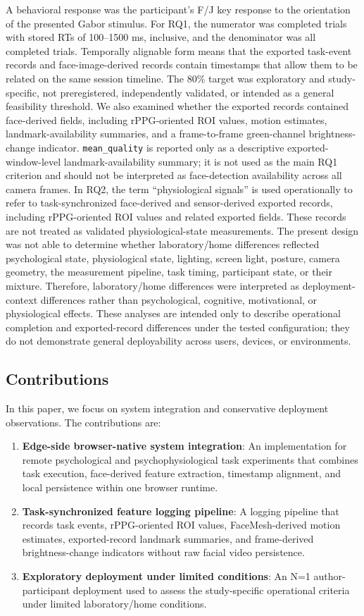 \documentclass[dvipdfmx]{ehis}
\begin{document}
A behavioral response was the participant's F/J key response to the orientation of the presented Gabor stimulus.
For RQ1, the numerator was completed trials with stored RTs of 100--1500 ms, inclusive, and the denominator was all completed trials.
Temporally alignable form means that the exported task-event records and face-image-derived records contain timestamps that allow them to be related on the same session timeline.
The 80\% target was exploratory and study-specific, not preregistered, independently validated, or intended as a general feasibility threshold.
We also examined whether the exported records contained face-derived fields, including rPPG-oriented ROI values, motion estimates, landmark-availability summaries, and a frame-to-frame green-channel brightness-change indicator.
\texttt{mean\_quality} is reported only as a descriptive exported-window-level landmark-availability summary; it is not used as the main RQ1 criterion and should not be interpreted as face-detection availability across all camera frames.
In RQ2, the term ``physiological signals'' is used operationally to refer to task-synchronized face-derived and sensor-derived exported records, including rPPG-oriented ROI values and related exported fields.
These records are not treated as validated physiological-state measurements.
The present design was not able to determine whether laboratory/home differences reflected psychological state, physiological state, lighting, screen light, posture, camera geometry, the measurement pipeline, task timing, participant state, or their mixture.
Therefore, laboratory/home differences were interpreted as deployment-context differences rather than psychological, cognitive, motivational, or physiological effects.
These analyses are intended only to describe operational completion and exported-record differences under the tested configuration; they do not demonstrate general deployability across users, devices, or environments.

\subsection{Contributions}
In this paper, we focus on system integration and conservative deployment observations. The contributions are:

\begin{enumerate}
    \item \textbf{Edge-side browser-native system integration}: An implementation for remote psychological and psychophysiological task experiments that combines task execution, face-derived feature extraction, timestamp alignment, and local persistence within one browser runtime.
    \item \textbf{Task-synchronized feature logging pipeline}: A logging pipeline that records task events, rPPG-oriented ROI values, FaceMesh-derived motion estimates, exported-record landmark summaries, and frame-derived brightness-change indicators without raw facial video persistence.
    \item \textbf{Exploratory deployment under limited conditions}: An N=1 author-participant deployment used to assess the study-specific operational criteria under limited laboratory/home conditions.
\end{enumerate}
\end{document}
